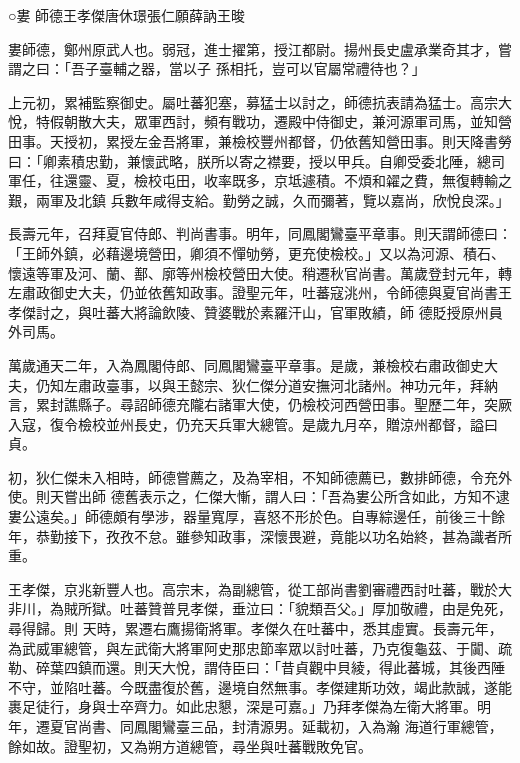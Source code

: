 
\begin{pinyinscope}

 ○婁
 師德王孝傑唐休璟張仁願薛訥王晙



 婁師德，鄭州原武人也。弱冠，進士擢第，授江都尉。揚州長史盧承業奇其才，嘗謂之曰：「吾子臺輔之器，當以子
 孫相托，豈可以官屬常禮待也？」



 上元初，累補監察御史。屬吐蕃犯塞，募猛士以討之，師德抗表請為猛士。高宗大悅，特假朝散大夫，眾軍西討，頻有戰功，遷殿中侍御史，兼河源軍司馬，並知營田事。天授初，累授左金吾將軍，兼檢校豐州都督，仍依舊知營田事。則天降書勞曰：「卿素積忠勤，兼懷武略，朕所以寄之襟要，授以甲兵。自卿受委北陲，總司軍任，往還靈、夏，檢校屯田，收率既多，京坻遽積。不煩和糴之費，無復轉輸之艱，兩軍及北鎮
 兵數年咸得支給。勤勞之誠，久而彌著，覽以嘉尚，欣悅良深。」



 長壽元年，召拜夏官侍郎、判尚書事。明年，同鳳閣鸞臺平章事。則天謂師德曰：「王師外鎮，必藉邊境營田，卿須不憚劬勞，更充使檢校。」又以為河源、積石、懷遠等軍及河、蘭、鄯、廓等州檢校營田大使。稍遷秋官尚書。萬歲登封元年，轉左肅政御史大夫，仍並依舊知政事。證聖元年，吐蕃寇洮州，令師德與夏官尚書王孝傑討之，與吐蕃大將論飲陵、贊婆戰於素羅汗山，官軍敗績，師
 德貶授原州員外司馬。



 萬歲通天二年，入為鳳閣侍郎、同鳳閣鸞臺平章事。是歲，兼檢校右肅政御史大夫，仍知左肅政臺事，以與王懿宗、狄仁傑分道安撫河北諸州。神功元年，拜納言，累封譙縣子。尋詔師德充隴右諸軍大使，仍檢校河西營田事。聖歷二年，突厥入寇，復令檢校並州長史，仍充天兵軍大總管。是歲九月卒，贈涼州都督，謚曰貞。



 初，狄仁傑未入相時，師德嘗薦之，及為宰相，不知師德薦已，數排師德，令充外使。則天嘗出師
 德舊表示之，仁傑大慚，謂人曰：「吾為婁公所含如此，方知不逮婁公遠矣。」師德頗有學涉，器量寬厚，喜怒不形於色。自專綜邊任，前後三十餘年，恭勤接下，孜孜不怠。雖參知政事，深懷畏避，竟能以功名始終，甚為識者所重。



 王孝傑，京兆新豐人也。高宗末，為副總管，從工部尚書劉審禮西討吐蕃，戰於大非川，為賊所獄。吐蕃贊普見孝傑，垂泣曰：「貌類吾父。」厚加敬禮，由是免死，尋得歸。則
 天時，累遷右鷹揚衛將軍。孝傑久在吐蕃中，悉其虛實。長壽元年，為武威軍總管，與左武衛大將軍阿史那忠節率眾以討吐蕃，乃克復龜茲、于闐、疏勒、碎葉四鎮而還。則天大悅，謂侍臣曰：「昔貞觀中貝綾，得此蕃城，其後西陲不守，並陷吐蕃。今既盡復於舊，邊境自然無事。孝傑建斯功效，竭此款誠，遂能裹足徒行，身與士卒齊力。如此忠懇，深是可嘉。」乃拜孝傑為左衛大將軍。明年，遷夏官尚書、同鳳閣鸞臺三品，封清源男。延載初，入為瀚
 海道行軍總管，餘如故。證聖初，又為朔方道總管，尋坐與吐蕃戰敗免官。




\end{pinyinscope}
